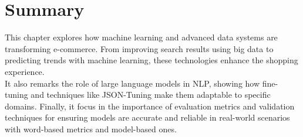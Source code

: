 \section{Summary}

This chapter explores how machine learning and advanced data systems are transforming e-commerce. From improving search results using big data to predicting trends with machine learning, these technologies enhance the shopping experience.
\\

It also remarks the role of large language models in NLP, showing how fine-tuning and techniques like JSON-Tuning make them adaptable to specific domains. Finally, it focus in the importance of evaluation metrics and validation techniques for ensuring models are accurate and reliable in real-world scenarios with word-based metrics and model-based ones.
